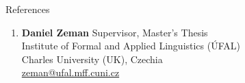 \documentclass{resume}
\begin{document}
\begin{rSection}{\faComments \hspace{0.5mm} References}

    \begin{enumerate}
        {common references}

        \item \textbf{Daniel Zeman} \hfill Supervisor, Master's Thesis\\
            Institute of Formal and Applied Linguistics ({\'U}FAL)\\
            Charles University (UK), Czechia\\
            \faEnvelope \hspace{0.5mm} \href{mailto:zeman@ufal.mff.cuni.cz}{zeman@ufal.mff.cuni.cz}
    \end{enumerate}

\end{rSection}
\end{document}
